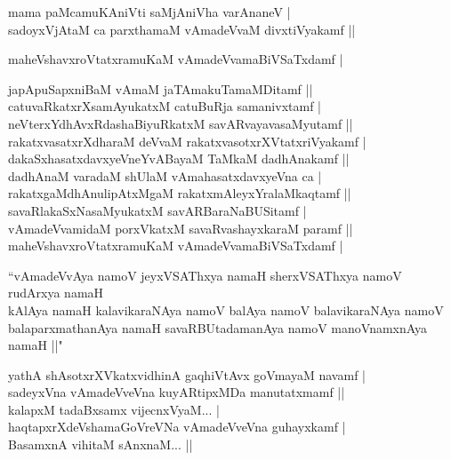 \begin{entry}
\begin{shl}
mama paMcamuKAniVti saMjAniVha varAnaneV |\\
sadoyxVjAtaM ca parxthamaM vAmadeVvaM divxtiVyakamf ||
\end{shl}
\begin{shl}
maheVshavxroVtatxramuKaM vAmadeVvamaBiVSaTxdamf |
\end{shl}
\begin{shl}
japApuSapxniBaM vAmaM jaTAmakuTamaMDitamf ||\\
catuvaRkatxrXsamAyukatxM catuBuRja samanivxtamf |\\
neVterxYdhAvxRdashaBiyuRkatxM savARvayavasaMyutamf ||\\
rakatxvasatxrXdharaM deVvaM rakatxvasotxrXVtatxriVyakamf |\\
dakaSxhasatxdavxyeVneYvABayaM TaMkaM dadhAnakamf ||\\
dadhAnaM varadaM shUlaM vAmahasatxdavxyeVna ca |\\
rakatxgaMdhAnulipAtxMgaM rakatxmAleyxYralaMkaqtamf ||\\
savaRlakaSxNasaMyukatxM savARBaraNaBUSitamf |\\
vAmadeVvamidaM porxVkatxM savaRvashayxkaraM paramf ||\\
maheVshavxroVtatxramuKaM vAmadeVvamaBiVSaTxdamf |
\end{shl}
\begin{shl}
``vAmadeVvAya namoV jeyxVSAThxya namaH sherxVSAThxya namoV rudArxya namaH\\
kAlAya namaH kalavikaraNAya namoV balAya namoV balavikaraNAya namoV\\
balaparxmathanAya namaH savaRBUtadamanAya namoV manoVnamxnAya namaH ||"
\end{shl}
\begin{shl}
yathA shAsotxrXVkatxvidhinA gaqhiVtAvx goVmayaM navamf |\\
sadeyxVna vAmadeVveVna kuyARtipxMDa manutatxmamf ||\\
kalapxM tadaBxsamx vijecnxVyaM... |\\
haqtapxrXdeVshamaGoVreVNa vAmadeVveVna guhayxkamf |\\
BasamxnA vihitaM sAnxnaM... ||
\end{shl}


\end{entry}
